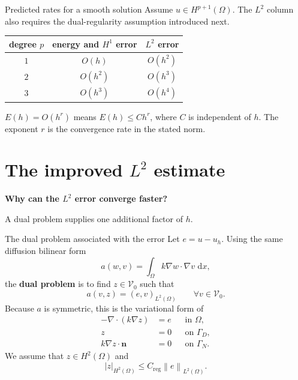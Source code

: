 \documentclass[11pt,aspectratio=169]{beamer}
\newcommand{\dd}{\,\mathrm{d}}
\newcommand{\Om}{\Omega}
\newcommand{\GamD}{\Gamma_D}
\newcommand{\GamN}{\Gamma_N}
\newcommand{\Vzero}{\mathcal V_0}
\newcommand{\divg}{\nabla\!\cdot}
\newcommand{\norm}[2][]{\left\lVert#2\right\rVert_{#1}}
\newcommand{\seminorm}[2][]{\left\lvert#2\right\rvert_{#1}}
\begin{document}
\begin{frame}{Predicted rates for a smooth solution}
Assume $u\in H^{p+1}(\Om)$. The $L^2$ column also requires the dual-regularity
assumption introduced next.
\par
\vspace{0.2cm}
\centering
\renewcommand{\arraystretch}{1.45}
\begin{tabular}{c|cc}
  \toprule
  degree $p$ & energy and $H^1$ error & $L^2$ error\\
  \midrule
  $1$ & $O(h)$ & $O(h^2)$\\
  $2$ & $O(h^2)$ & $O(h^3)$\\
  $3$ & $O(h^3)$ & $O(h^4)$\\
  \bottomrule
\end{tabular}
\par
\vspace{0.4cm}
$E(h)=O(h^r)$ means $E(h)\leq Ch^r$, where $C$ is independent of $h$.
The exponent $r$ is the convergence rate in the stated norm.
\end{frame}

\section{The improved \texorpdfstring{$L^2$}{L2} estimate}

\begin{frame}[plain]
  \centering\vfill
  {\LARGE\bfseries Why can the $L^2$ error converge faster?\par}
  \vspace{0.45cm}
  {\large A dual problem supplies one additional factor of $h$.\par}
  \vfill
\end{frame}

\begin{frame}{The dual problem associated with the error}
Let $e=u-u_h$. Using the same diffusion bilinear form
\[
  a(w,v)=\int_\Om k\nabla w\cdot\nabla v\,\dd x,
\]
the \textbf{dual problem} is to find $z\in\Vzero$ such that
\[
  a(v,z)=(e,v)_{L^2(\Om)}
  \qquad\forall v\in\Vzero.
\]
Because $a$ is symmetric, this is the variational form of
\[
  \begin{aligned}
  -\divg(k\nabla z)&=e &&\text{in }\Om,\\
  z&=0 &&\text{on }\GamD,\\
  k\nabla z\cdot\bm n&=0 &&\text{on }\GamN.
  \end{aligned}
\]
We assume that $z\in H^2(\Om)$ and
\[
  \seminorm[H^2(\Om)]{z}
  \leq C_{\mathrm{reg}}\norm[L^2(\Om)]{e}.
\]
\end{frame}
\end{document}
